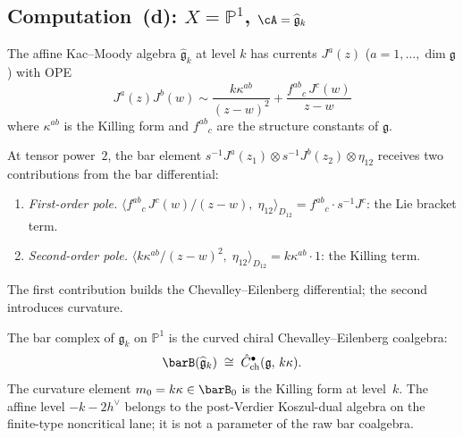 \subsection*{Computation~(d): $X = \mathbb{P}^1$,
 $\cA = \widehat{\mathfrak{g}}_k$}

The affine Kac--Moody algebra $\widehat{\mathfrak{g}}_k$ at
level $k$ has currents $J^a(z)$ ($a = 1, \ldots, \dim\mathfrak{g}$)
with OPE
\begin{equation}\label{eq:fourier-km-ope}
J^a(z)J^b(w) \sim \frac{k\kappa^{ab}}{(z-w)^2}
+ \frac{f^{ab}{}_c\,J^c(w)}{z-w}
\end{equation}
where $\kappa^{ab}$ is the Killing form and $f^{ab}{}_c$ are the
structure constants of $\mathfrak{g}$.

\begin{computation}
\label{comp:fourier-km-bar}
At tensor power~$2$, the bar element
$s^{-1}J^a(z_1) \otimes s^{-1}J^b(z_2) \otimes \eta_{12}$ receives
two contributions from the bar differential:
\begin{enumerate}
\item \emph{First-order pole.}
 $\bigl\langle f^{ab}{}_c\, J^c(w)/(z-w),\;
 \eta_{12}\bigr\rangle_{D_{12}}
 = f^{ab}{}_c \cdot s^{-1}J^c$:
 the Lie bracket term.
\item \emph{Second-order pole.}
 $\bigl\langle k\kappa^{ab}/(z-w)^2,\;
 \eta_{12}\bigr\rangle_{D_{12}}
 = k\kappa^{ab} \cdot 1$:
 the Killing term.
\end{enumerate}
The first contribution builds the Chevalley--Eilenberg differential;
the second introduces curvature.
\end{computation}

\begin{theorem}[\ClaimStatusProvedHere]
\label{thm:fourier-km-bar}
The bar complex of $\widehat{\mathfrak{g}}_k$ on $\mathbb{P}^1$ is
the curved chiral Chevalley--Eilenberg coalgebra:
\begin{equation}\label{eq:fourier-km-bar}
\barB(\widehat{\mathfrak{g}}_k) \;\cong\;
\hat{C}^\bullet_{\mathrm{ch}}(\mathfrak{g},\, k\kappa).
\end{equation}
The curvature element $m_0 = k\kappa \in \barB_0$ is the Killing
form at level~$k$. The affine level $-k-2h^\vee$ belongs to the
post-Verdier Koszul-dual algebra on the finite-type noncritical lane;
it is not a parameter of the raw bar coalgebra.
\end{theorem}

